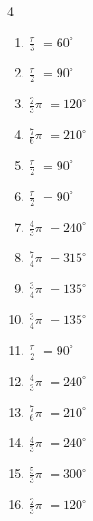 \begin{multicols}{4}
\begin{enumerate}
  \item $\displaystyle \frac{\pi}{3}$
        $\displaystyle =60^{\circ}$

  \item $\displaystyle \frac{\pi}{2}$
        $\displaystyle =90^{\circ}$

  \item $\displaystyle \frac{2}{3}\pi$
        $\displaystyle =120^{\circ}$

  \item $\displaystyle \frac{7}{6}\pi$
        $\displaystyle =210^{\circ}$

  \item $\displaystyle \frac{\pi}{2}$
        $\displaystyle =90^{\circ}$

  \item $\displaystyle \frac{\pi}{2}$
        $\displaystyle =90^{\circ}$

  \item $\displaystyle \frac{4}{3}\pi$
        $\displaystyle =240^{\circ}$

  \item $\displaystyle \frac{7}{4}\pi$
        $\displaystyle =315^{\circ}$

  \item $\displaystyle \frac{3}{4}\pi$
        $\displaystyle =135^{\circ}$

  \item $\displaystyle \frac{3}{4}\pi$
        $\displaystyle =135^{\circ}$

  \item $\displaystyle \frac{\pi}{2}$
        $\displaystyle =90^{\circ}$

  \item $\displaystyle \frac{4}{3}\pi$
        $\displaystyle =240^{\circ}$

  \item $\displaystyle \frac{7}{6}\pi$
        $\displaystyle =210^{\circ}$

  \item $\displaystyle \frac{4}{3}\pi$
        $\displaystyle =240^{\circ}$

  \item $\displaystyle \frac{5}{3}\pi$
        $\displaystyle =300^{\circ}$

\columnbreak %

\resetques

  \item $\displaystyle \frac{2}{3}\pi$
        $\displaystyle =120^{\circ}$


\end{enumerate}
\end{multicols}
